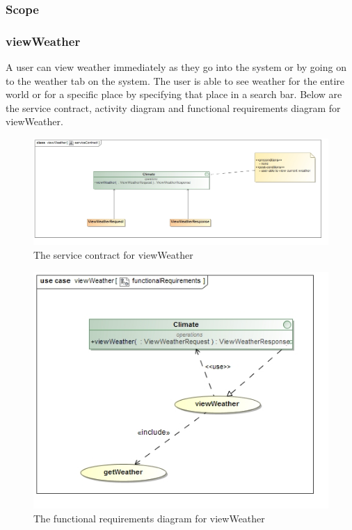 \subsubsection{Scope}


\subsubsection{viewWeather}

A user can view weather immediately as they go into the system or by going on to the weather tab on the system. The user is able to see weather for the entire world or for a specific place by specifying that place in a search bar. Below are the service contract, activity diagram and functional requirements diagram for viewWeather.

\begin{figure}[H]
	\centering
	\includegraphics[width=1.0\textwidth]{../images/funcReq/viewWeatherServiceContract.jpg}
	\caption{The service contract for viewWeather \label{overflow}}
\end{figure}

\begin{figure}[H]
	\centering
	\includegraphics[width=1.0\textwidth]{../images/funcReq/viewWeatherFunctionalRequirements.jpg}
	\caption{The functional requirements diagram for viewWeather \label{overflow}}
\end{figure}


